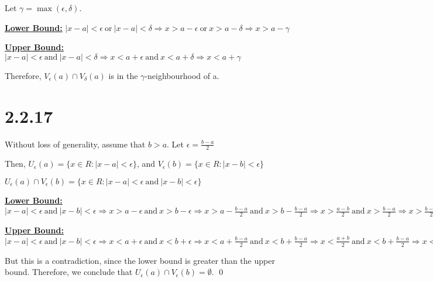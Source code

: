 \documentclass{article}
\begin{document}
\noindent
Let $\gamma = \max(\epsilon, \delta)$.
\newline

\noindent
\textbf{\underline{Lower Bound:}}
$|x-a| < \epsilon \ \text{or} \ |x-a| < \delta \Rightarrow x > a-\epsilon \ \text{or} \ x > a-\delta \Rightarrow x > a-\gamma$
\newline

\noindent
\textbf{\underline{Upper Bound:}}
$|x-a| < \epsilon \ \text{and} \ |x-a| < \delta \Rightarrow x < a+\epsilon \ \text{and} \ x < a+\delta \Rightarrow x < a+\gamma$
\newline

\noindent
Therefore, $V_{\epsilon}(a) \cap V_{\delta}(a)$ is in the $\gamma$-neighbourhood of a.
\newline

\section*{2.2.17}
Without loss of generality, assume that $b>a$. Let $\epsilon=\frac{b-a}{2}$
\newline

\noindent
Then, $U_{\epsilon}(a)=\{x \in R: |x-a| < \epsilon\}$, and $V_{\epsilon}(b)=\{x \in R: |x-b| < \epsilon\}$
\newline

\noindent
$U_{\epsilon}(a) \cap V_{\epsilon}(b) = \{x \in R: |x-a| < \epsilon \ \text{and} \ |x-b| < \epsilon\}$
\newline

\noindent
\textbf{\underline{Lower Bound:}}
$|x-a| < \epsilon \ \text{and} \ |x-b| < \epsilon \Rightarrow x > a-\epsilon \ \text{and} \ x > b-\epsilon \Rightarrow x > a-\frac{b-a}{2} \ \text{and} \  x > b - \frac{b-a}{2} \Rightarrow x > \frac{a-b}{2} \ \text{and} \  x > \frac{b-a}{2} \Rightarrow x > \frac{b-a}{2}$
\newline

\noindent
\textbf{\underline{Upper Bound:}}
$|x-a| < \epsilon \ \text{and} \ |x-b| < \epsilon \Rightarrow x < a+\epsilon \ \text{and} \ x < b+\epsilon \Rightarrow x < a+\frac{b-a}{2} \ \text{and} \  x < b + \frac{b-a}{2} \Rightarrow x < \frac{a+b}{2} \ \text{and} \  x < b+ \frac{b-a}{2} \Rightarrow x < \frac{a+b}{2}$
\newline

\noindent
But this is a contradiction, since the lower bound is greater than the upper bound. Therefore, we conclude that $U_{\epsilon}(a) \cap V_{\epsilon}(b) = \emptyset$.
\qed
\end{document}
